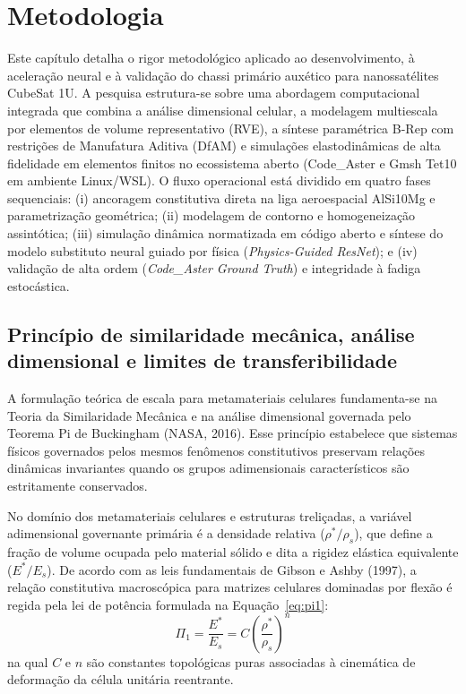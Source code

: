 \chapter{Metodologia}
\label{cap:metodologia}

Este capítulo detalha o rigor metodológico aplicado ao desenvolvimento, à aceleração neural e à validação do chassi primário auxético para nanossatélites CubeSat 1U. A pesquisa estrutura-se sobre uma abordagem computacional integrada que combina a análise dimensional celular, a modelagem multiescala por elementos de volume representativo (RVE), a síntese paramétrica B-Rep com restrições de Manufatura Aditiva (DfAM) e simulações elastodinâmicas de alta fidelidade em elementos finitos no ecossistema aberto (Code\_Aster e Gmsh Tet10 em ambiente Linux/WSL). O fluxo operacional está dividido em quatro fases sequenciais: (i) ancoragem constitutiva direta na liga aeroespacial AlSi10Mg e parametrização geométrica; (ii) modelagem de contorno e homogeneização assintótica; (iii) simulação dinâmica normatizada em código aberto e síntese do modelo substituto neural guiado por física (\textit{Physics-Guided ResNet}); e (iv) validação de alta ordem (\textit{Code\_Aster Ground Truth}) e integridade à fadiga estocástica.

\section{Princípio de similaridade mecânica, análise dimensional e limites de transferibilidade}
\label{sec:similaridade}

A formulação teórica de escala para metamateriais celulares fundamenta-se na Teoria da Similaridade Mecânica e na análise dimensional governada pelo Teorema Pi de Buckingham (NASA, 2016). Esse princípio estabelece que sistemas físicos governados pelos mesmos fenômenos constitutivos preservam relações dinâmicas invariantes quando os grupos adimensionais característicos são estritamente conservados.

No domínio dos metamateriais celulares e estruturas treliçadas, a variável adimensional governante primária é a densidade relativa ($\rho^{*}/\rho_s$), que define a fração de volume ocupada pelo material sólido e dita a rigidez elástica equivalente ($E^{*}/E_s$). De acordo com as leis fundamentais de Gibson e Ashby (1997), a relação constitutiva macroscópica para matrizes celulares dominadas por flexão é regida pela lei de potência formulada na Equação~\eqref{eq:pi1}:
\begin{equation}
  \Pi_1 = \frac{E^{*}}{E_s} = C \left( \frac{\rho^{*}}{\rho_s} \right)^{n}
  \label{eq:pi1}
\end{equation}
na qual $C$ e $n$ são constantes topológicas puras associadas à cinemática de deformação da célula unitária reentrante.

